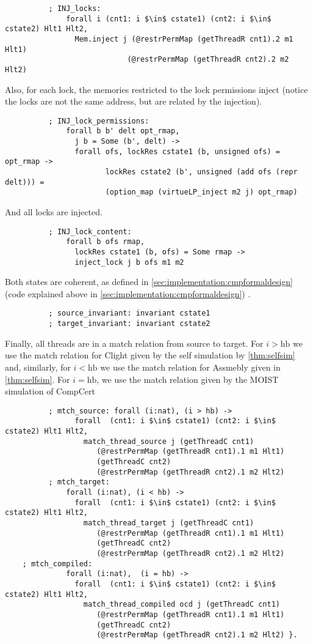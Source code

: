 \begin{lstlisting}
          ; INJ_locks:
              forall i (cnt1: i $\in$ cstate1) (cnt2: i $\in$  cstate2) Hlt1 Hlt2,
                Mem.inject j (@restrPermMap (getThreadR cnt1).2 m1 Hlt1)
                            (@restrPermMap (getThreadR cnt2).2 m2 Hlt2)
\end{lstlisting}     
\noindent Also, for each lock, the memories restricted to the lock permissions inject (notice the locks are not the same address, but are related by the injection).
\begin{lstlisting}
          ; INJ_lock_permissions:
              forall b b' delt opt_rmap,
                j b = Some (b', delt) ->
                forall ofs, lockRes cstate1 (b, unsigned ofs) = opt_rmap ->
                       lockRes cstate2 (b', unsigned (add ofs (repr delt))) =
                       (option_map (virtueLP_inject m2 j) opt_rmap)
\end{lstlisting}     
\noindent And all locks are injected.
\begin{lstlisting}
          ; INJ_lock_content:
              forall b ofs rmap,
                lockRes cstate1 (b, ofs) = Some rmap ->
                inject_lock j b ofs m1 m2    
\end{lstlisting}     
\noindent Both states are coherent, as defined in \cref{sec:implementation:cmpformaldesign} (code explained above in \cref{sec:implementation:cmpformaldesign}) .
\begin{lstlisting}
          ; source_invariant: invariant cstate1    
          ; target_invariant: invariant cstate2
\end{lstlisting}     
\noindent Finally, all threads are in a match relation from source to target. For $i>\text{hb}$ we use the match relation for Clight given by the self simulation by \cref{thm:selfsim} and, 
similarly, for $i<\text{hb}$ we use the match relation for Assmebly given in \cref{thm:selfsim}. For $i=\text{hb}$, we use the match  relation given by the MOIST simulation of CompCert 
\begin{lstlisting}
          ; mtch_source: forall (i:nat), (i > hb) -> 
                forall  (cnt1: i $\in$ cstate1) (cnt2: i $\in$ cstate2) Hlt1 Hlt2,
                  match_thread_source j (getThreadC cnt1)
				     (@restrPermMap (getThreadR cnt1).1 m1 Hlt1)
				     (getThreadC cnt2)
				     (@restrPermMap (getThreadR cnt2).1 m2 Hlt2)
          ; mtch_target:
              forall (i:nat), (i < hb) -> 
                forall  (cnt1: i $\in$ cstate1) (cnt2: i $\in$ cstate2) Hlt1 Hlt2,
                  match_thread_target j (getThreadC cnt1)
				     (@restrPermMap (getThreadR cnt1).1 m1 Hlt1)
				     (getThreadC cnt2)
				     (@restrPermMap (getThreadR cnt2).1 m2 Hlt2)       
	; mtch_compiled:
              forall (i:nat),  (i = hb) -> 
                forall  (cnt1: i $\in$ cstate1) (cnt2: i $\in$ cstate2) Hlt1 Hlt2,
                  match_thread_compiled ocd j (getThreadC cnt1)
				     (@restrPermMap (getThreadR cnt1).1 m1 Hlt1)
				     (getThreadC cnt2)
				     (@restrPermMap (getThreadR cnt2).1 m2 Hlt2) }.
\end{lstlisting}	
